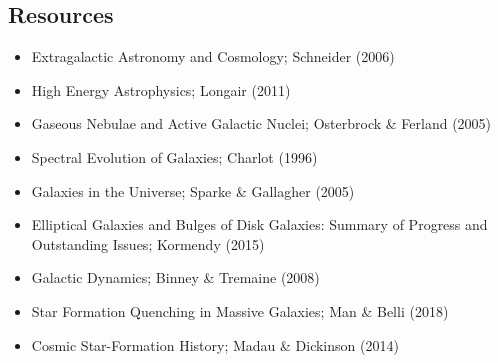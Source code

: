 \documentclass[a4paper,11pt]{article}
\begin{document}

\newpage
\subsection{Resources}

\begin{itemize}
    \item Extragalactic Astronomy and Cosmology; Schneider (2006)
    \item High Energy Astrophysics; Longair (2011)
    \item Gaseous Nebulae and Active Galactic Nuclei; Osterbrock \& Ferland (2005)
    \item Spectral Evolution of Galaxies; Charlot (1996)
    \item Galaxies in the Universe; Sparke \& Gallagher (2005)
    \item Elliptical Galaxies and Bulges of Disk Galaxies: Summary of Progress and Outstanding Issues; Kormendy (2015)
    \item Galactic Dynamics; Binney \& Tremaine (2008)
    \item Star Formation Quenching in Massive Galaxies; Man \& Belli (2018)
    \item Cosmic Star-Formation History; Madau \& Dickinson (2014)
\end{itemize}
\end{document}
